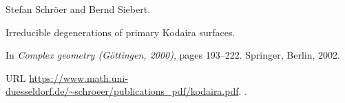Stefan Schr{\"o}er and Bernd Siebert.

\newblock Irreducible degenerations of primary {Kodaira} surfaces.

\newblock In \emph{Complex geometry ({G}{\"o}ttingen, 2000)}, pages 193--222.
  Springer, Berlin, 2002.

\newblock URL
  \url{https://www.math.uni-duesseldorf.de/~schroeer/publications_pdf/kodaira.pdf}.
\newblock {}.
